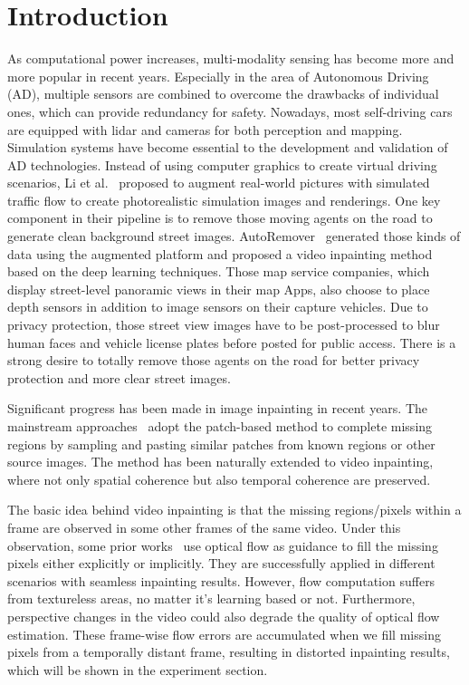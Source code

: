 \documentclass[runningheads]{llncs}
\begin{document}
\section{Introduction}
As computational power increases, multi-modality sensing has become more and more popular in recent years. Especially in the area of Autonomous Driving (AD), multiple sensors are combined to overcome the drawbacks of individual ones, which can provide redundancy for safety. Nowadays, most self-driving cars are equipped with lidar and cameras for both perception and mapping. Simulation systems have become essential to the development and validation of AD  technologies. Instead of using computer graphics to create virtual driving scenarios, Li et al.~\cite{Lieaaw0863} proposed to augment real-world pictures with simulated traffic flow to create photorealistic simulation images and renderings. One key component in their pipeline is to remove those moving agents on the road to generate clean background street images. AutoRemover~\cite{zhang2019autoremover} generated those kinds of data using the augmented platform and proposed a video inpainting method based on the deep learning techniques. Those map service companies, which display street-level panoramic views in their map Apps, also choose to place depth sensors in addition to image sensors on their capture vehicles. Due to privacy protection, those street view images have to be post-processed to blur human faces and vehicle license plates before posted for public access. There is a strong desire to totally remove those agents on the road for better privacy protection and more clear street images. 









Significant progress has been made in image inpainting in recent years. The mainstream approaches~\cite{simakov2008summarizing, Darabi12:ImageMelding12, Efros:2001:IQT:383259.383296} adopt the patch-based method to complete missing regions by sampling and pasting similar patches from known regions or other source images. The method has been naturally extended to video inpainting, where not only spatial coherence but also temporal coherence are preserved.

The basic idea behind video inpainting is that the missing regions/pixels within a frame are observed in some other frames of the same video. Under this observation, some prior works~\cite{Xu_2019_CVPR, Huang-SigAsia-2016, wang2018videoinp} use optical flow as guidance to fill the missing pixels either explicitly or implicitly. They are successfully applied in different scenarios with seamless inpainting results. However, flow computation suffers from textureless areas, no matter it's learning based or not. Furthermore, perspective changes in the video could also degrade the quality of optical flow estimation. These frame-wise flow errors are accumulated when we fill missing pixels from a temporally distant frame, resulting in distorted inpainting results, which will be shown in the experiment section. 
 
\end{document}
